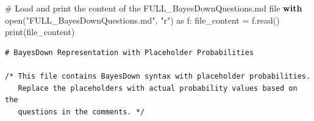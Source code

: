 \documentclass[
  11pt,
  letterpaper,
]{book}
\newenvironment{Shaded}{\begin{snugshade}}{\end{snugshade}}
\newcommand{\BuiltInTok}[1]{\textcolor[rgb]{0.00,0.23,0.31}{#1}}
\newcommand{\CommentTok}[1]{\textcolor[rgb]{0.37,0.37,0.37}{#1}}
\newcommand{\ControlFlowTok}[1]{\textcolor[rgb]{0.00,0.23,0.31}{\textbf{#1}}}
\newcommand{\ImportTok}[1]{\textcolor[rgb]{0.00,0.46,0.62}{#1}}
\newcommand{\NormalTok}[1]{\textcolor[rgb]{0.00,0.23,0.31}{#1}}
\newcommand{\OperatorTok}[1]{\textcolor[rgb]{0.37,0.37,0.37}{#1}}
\newcommand{\StringTok}[1]{\textcolor[rgb]{0.13,0.47,0.30}{#1}}
\begin{document}
\begin{Shaded}
\begin{Highlighting}[]
\CommentTok{\# Load and print the content of the \textquotesingle{}FULL\_BayesDownQuestions.md\textquotesingle{} file}
\ControlFlowTok{with} \BuiltInTok{open}\NormalTok{(}\StringTok{"FULL\_BayesDownQuestions.md"}\NormalTok{, }\StringTok{"r"}\NormalTok{) }\ImportTok{as}\NormalTok{ f:}
\NormalTok{    file\_content }\OperatorTok{=}\NormalTok{ f.read()}
    \BuiltInTok{print}\NormalTok{(file\_content)}
\end{Highlighting}
\end{Shaded}

\begin{verbatim}
# BayesDown Representation with Placeholder Probabilities

/* This file contains BayesDown syntax with placeholder probabilities.
   Replace the placeholders with actual probability values based on the 
   questions in the comments. */


\end{verbatim}
\end{document}
